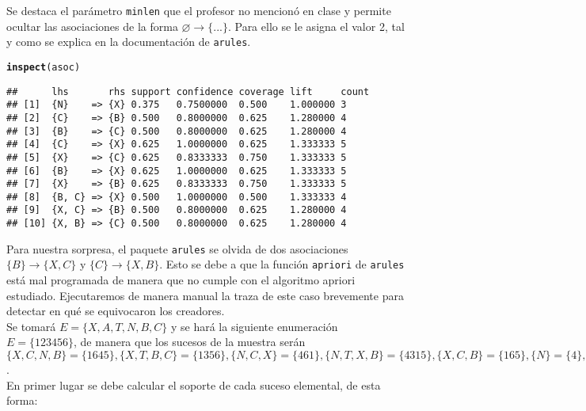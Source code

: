 \documentclass[12pt]{report}\usepackage[]{graphicx}\usepackage[dvipsnames]{xcolor}
\makeatletter
\newcommand{\hlstd}[1]{\textcolor[rgb]{0.345,0.345,0.345}{#1}}%
\newcommand{\hlkwd}[1]{\textcolor[rgb]{0.737,0.353,0.396}{\textbf{#1}}}%
\newenvironment{kframe}{%
 \def\at@end@of@kframe{}%
 \ifinner\ifhmode%
  \def\at@end@of@kframe{\end{minipage}}%
  \begin{minipage}{\columnwidth}%
 \fi\fi%
 \def\FrameCommand##1{\hskip\@totalleftmargin \hskip-\fboxsep
 \colorbox{shadecolor}{##1}\hskip-\fboxsep
     \hskip-\linewidth \hskip-\@totalleftmargin \hskip\columnwidth}%
 \MakeFramed {\advance\hsize-\width
   \@totalleftmargin\z@ \linewidth\hsize
   \@setminipage}}%
 {\par\unskip\endMakeFramed%
 \at@end@of@kframe}
\newenvironment{knitrout}{}{} %
\makeatother
\begin{document}
			Se destaca el parámetro \texttt{minlen} que el profesor no mencionó en clase y permite ocultar las asociaciones de la forma $\varnothing \rightarrow \{...\}$. Para ello se le asigna el valor 2, tal y como se explica en la documentación de \texttt{arules}. 
			
\begin{knitrout}
\color{fgcolor}\begin{kframe}
\begin{alltt}
\hlkwd{inspect}\hlstd{(asoc)}
\end{alltt}
\begin{verbatim}
##      lhs       rhs support confidence coverage lift     count
## [1]  {N}    => {X} 0.375   0.7500000  0.500    1.000000 3    
## [2]  {C}    => {B} 0.500   0.8000000  0.625    1.280000 4    
## [3]  {B}    => {C} 0.500   0.8000000  0.625    1.280000 4    
## [4]  {C}    => {X} 0.625   1.0000000  0.625    1.333333 5    
## [5]  {X}    => {C} 0.625   0.8333333  0.750    1.333333 5    
## [6]  {B}    => {X} 0.625   1.0000000  0.625    1.333333 5    
## [7]  {X}    => {B} 0.625   0.8333333  0.750    1.333333 5    
## [8]  {B, C} => {X} 0.500   1.0000000  0.500    1.333333 4    
## [9]  {X, C} => {B} 0.500   0.8000000  0.625    1.280000 4    
## [10] {X, B} => {C} 0.500   0.8000000  0.625    1.280000 4
\end{verbatim}
\end{kframe}
\end{knitrout}
			
			Para nuestra sorpresa, el paquete \texttt{arules} se olvida de dos asociaciones $\{B\} \rightarrow \{X, C\}$ y $\{C\} \rightarrow \{X, B\}$. Esto se debe a que la función \texttt{apriori} de \texttt{arules} está mal programada de manera que no cumple con el algoritmo apriori estudiado. Ejecutaremos de manera manual la traza de este caso brevemente para detectar en qué se equivocaron los creadores. \\
			
			Se tomará $E = \{X, A, T, N, B, C\}$ y se hará la siguiente enumeración $E = \{123456\}$, de manera que los sucesos de la muestra serán $\{X, C, N, B\} = \{1645\}, \{X, T, B, C\} = \{1356\}, \{N, C, X\} = \{461\}, \{N, T, X, B\} = \{4315\}, \{X, C, B\} = \{165\}, \{N\} = \{4\}, \{X, B, C\} = \{156\}, \{T, A\} = \{32\}$. \\
			
			En primer lugar se debe calcular el soporte de cada suceso elemental, de esta forma: 
			
\end{document}
